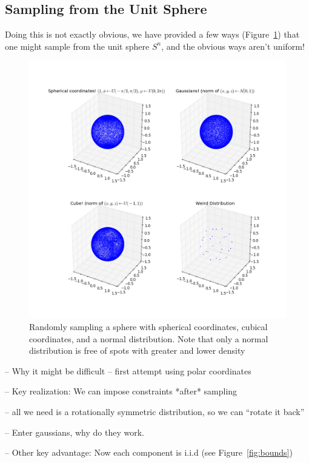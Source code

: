 \documentclass[11pt]{article}
\begin{document}
\subsection{Sampling from the Unit Sphere}

Doing this is not exactly obvious, we have provided a few ways
(Figure~\ref{fig:spheres}) that one might sample from the unit sphere $S^n$, and
the obvious ways aren't uniform!

\begin{figure}
  \begin{center}
    \includegraphics[width=0.9\linewidth]{spheres.png}
  \end{center}

  \caption{Randomly sampling a sphere with spherical coordinates, cubical
    coordinates, and a normal distribution. Note that only a normal distribution
    is free of spots with greater and lower density}
  \label{fig:spheres}
\end{figure}

-- Why it might be difficult
-- first attempt using polar coordinates

-- Key realization: We can impose constraints *after* sampling

   -- all we need is a rotationally symmetric distribution, so we can ``rotate
   it back''

-- Enter gaussians, why do they work.

-- Other key advantage: Now each component is i.i.d (see Figure~\ref{fig:bounds})
\end{document}
